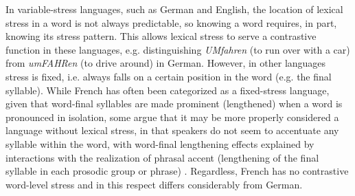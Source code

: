 \documentclass[a4paper]{article}
\begin{document}
In variable-stress languages, such as German and English, 
the location of lexical stress in a word is not always predictable,
so knowing a word requires, in part, knowing its stress pattern. This allows lexical stress to serve a contrastive function in these languages, 
e.g. distinguishing \textit{UMfahren} (to run over with a car)  from \textit{umFAHRen} (to drive around) in German. 
%
However, in other languages stress is fixed, i.e. 
always falls on a certain position in the word (e.g. the final syllable).%
While French has often been categorized as a fixed-stress language, given that word-final syllables are made prominent (lengthened) when a word is pronounced in isolation, some argue that it may be more properly considered a language without lexical stress, in that speakers do not seem to accentuate any syllable within the word, with word-final lengthening effects explained by interactions with the realization of phrasal accent (lengthening of the final syllable in each prosodic group or phrase) \cite{Michaux2013,Dupoux1997}. %
Regardless, French has no contrastive word-level stress %
and in this respect differs considerably from German.
\end{document}

